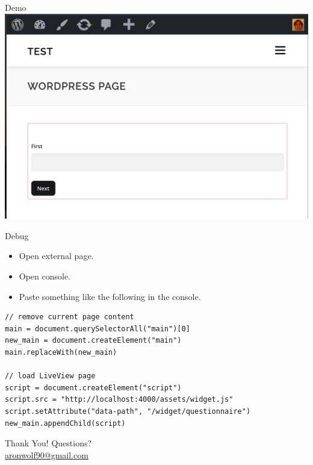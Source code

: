 \documentclass{beamer}
\begin{document}
\begin{frame}{Demo}
  \centering
  \includegraphics[width=1\linewidth]{images/demo.png}
\end{frame}

\begin{frame}[containsverbatim]{Debug}
\begin{itemize}
  \item Open external page.
  \item Open console.
  \item Paste something like the following in the console.
\end{itemize}
\hfill \break
\centering
\begin{verbatim}
// remove current page content
main = document.querySelectorAll("main")[0]
new_main = document.createElement("main")
main.replaceWith(new_main)

// load LiveView page
script = document.createElement("script")
script.src = "http://localhost:4000/assets/widget.js"
script.setAttribute("data-path", "/widget/questionnaire")
new_main.appendChild(script)
\end{verbatim}
\end{frame}


\begin{frame}{Thank You!}
  \centering
  \Large Questions? \\
  \vspace{1cm}
  \normalsize
  \href{your.email@example.com}{aronwolf90@gmail.com}
\end{frame}
\end{document}
